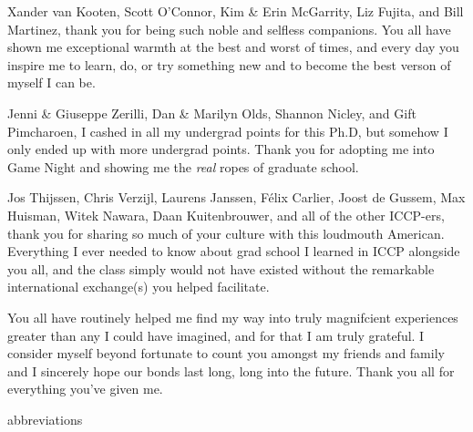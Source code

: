 \documentclass[mixedtoc]{msu-thesis-custom}
\begin{document}
Xander van Kooten, Scott O'Connor, Kim \& Erin McGarrity, Liz Fujita, and Bill
Martinez, thank you for being such noble and selfless companions. You all have
shown me exceptional warmth at the best and worst of times, and every day you
inspire me to learn, do, or try something new and to become the best verson of
myself I can be.

Jenni \& Giuseppe Zerilli, Dan \& Marilyn Olds, Shannon Nicley, and Gift
Pimcharoen, I cashed in all my undergrad points for this Ph.D, but somehow I
only ended up with more undergrad points. Thank you for adopting me into Game
Night and showing me the \emph{real} ropes of graduate school.


Jos Thijssen, Chris Verzijl, Laurens Janssen, F\'elix Carlier, Joost de Gussem,
Max Huisman, Witek Nawara, Daan Kuitenbrouwer, and all of the other ICCP-ers,
thank you for sharing so much of your culture with this loudmouth American.
Everything I ever needed to know about grad school I learned in ICCP alongside
you all, and the class simply would not have existed without the remarkable
international exchange(s) you helped facilitate.


You all have routinely helped me find my way into truly magnifcient experiences
greater than any I could have imagined, and for that I am truly grateful. I
consider myself beyond fortunate to count you amongst my friends and family and
I sincerely hope our bonds last long, long into the future. Thank you all for
everything you've given me.

\begin{center}
  \smiley{}
\end{center}



\clearpage
\SingleSpacing
\tableofcontents* %
\clearpage
\listoftables %
\clearpage
\listoffigures %

%
\makenomenclature
{abbreviations}

\mainmatter
%
\end{document}
